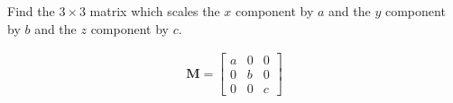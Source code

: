Find the $3 \times 3$ matrix which scales the $x$ component by $a$ and the $y$ component by $b$ and the $z$ component by $c$.

\begin{solution}
\begin{align*}
    \boldsymbol{M} = \begin{bmatrix}
    a & 0 & 0 \\ 0 & b & 0 \\ 0 & 0 & c
    \end{bmatrix}
\end{align*}
\end{solution}